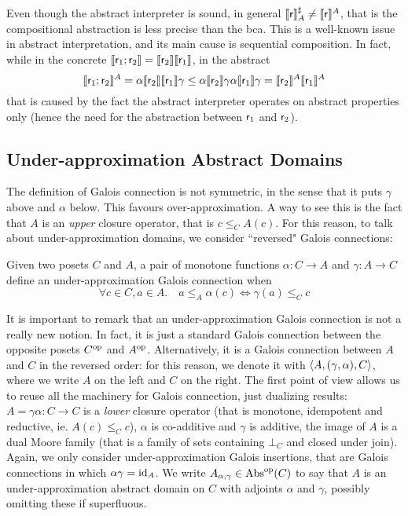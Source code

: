 Even though the abstract interpreter is sound, in general $\llbracket\mathsf{r}\rrbracket^{\sharp}_{A} \neq \llbracket\mathsf{r}\rrbracket^{A}$, that is the compositional abstraction is less precise than the bca. This is a well-known issue in abstract interpretation, and its main cause is sequential composition. In fact, while in the concrete $\llbracket\mathsf{r}_1; \mathsf{r}_2\rrbracket = \llbracket\mathsf{r}_2\rrbracket \llbracket\mathsf{r}_1\rrbracket$, in the abstract
\[
\llbracket\mathsf{r}_1; \mathsf{r}_2\rrbracket^{A} = \alpha \llbracket\mathsf{r}_2\rrbracket \llbracket\mathsf{r}_1\rrbracket \gamma \le \alpha \llbracket\mathsf{r}_2\rrbracket \gamma \alpha \llbracket\mathsf{r}_1\rrbracket \gamma = \llbracket\mathsf{r}_2\rrbracket^{A} \llbracket\mathsf{r}_1\rrbracket^{A}
\]
that is caused by the fact the abstract interpreter operates on abstract properties only (hence the need for the abstraction between $\mathsf{r}_1$ and $\mathsf{r}_2$).

\subsection{Under-approximation Abstract Domains}
The definition of Galois connection is not symmetric, in the sense that it puts $\gamma$ above and $\alpha$ below. This favours over-approximation. A way to see this is the fact that $A$ is an \emph{upper} closure operator, that is $c \le_C A(c)$. For this reason, to talk about under-approximation domains, we consider ``reversed" Galois connections:
\begin{definition}
	Given two posets $C$ and $A$, a pair of monotone functions $\alpha : C \rightarrow A$ and $\gamma : A \rightarrow C$ define an under-approximation Galois connection when 
	\[
	\forall c \in C, a \in A.\quad a \le_A \alpha(c) \iff \gamma(a) \le_C c
	\]
\end{definition}
It is important to remark that an under-approximation Galois connection is not a really new notion. In fact, it is just a standard Galois connection between the opposite posets $C^{\text{op}}$ and $A^{\text{op}}$. Alternatively, it is a Galois connection between $A$ and $C$ in the reversed order: for this reason, we denote it with $\langle A, (\gamma, \alpha), C \rangle$, where we write $A$ on the left and $C$ on the right. The first point of view allows us to reuse all the machinery for Galois connection, just dualizing results: $A = \gamma \alpha : C \rightarrow C$ is a \emph{lower} closure operator (that is monotone, idempotent and reductive, ie. $A(c) \le_C c$), $\alpha$ is co-additive and $\gamma$ is additive, the image of $A$ is a dual Moore family (that is a family of sets containing $\bot_C$ and closed under join).
Again, we only consider under-approximation Galois insertions, that are Galois connections in which $\alpha \gamma = \text{id}_A$. We write $A_{\alpha, \gamma} \in \text{\normalfont Abs}^{\text{op}}(C)$ to say that $A$ is an under-approximation abstract domain on $C$ with adjoints $\alpha$ and $\gamma$, possibly omitting these if superfluous.

